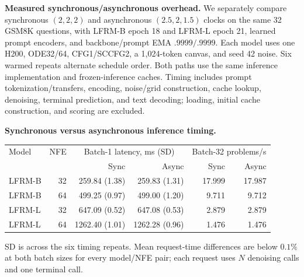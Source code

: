 \documentclass{article}
\newenvironment{revision}{\begingroup\color{blue}}{\endgroup}
\newcommand{\reviewcolor}{\color{blue}}
\begin{document}
\begin{revision}
\noindent\begin{minipage}{\linewidth}\reviewcolor
\textbf{Measured synchronous/asynchronous overhead.} We separately compare synchronous $(2,2,2)$ and asynchronous $(2.5,2,1.5)$ clocks on the same 32 GSM8K questions, with LFRM-B epoch 18 and LFRM-L epoch 21, learned prompt encoders, and backbone/prompt EMA $.9999/.9999$. Each model uses one H200, ODE32/64, CFG1/SCCFG2, a 1,024-token canvas, and seed 42 noise. Six warmed repeats alternate schedule order. Both paths use the same inference implementation and frozen-inference caches. Timing includes prompt tokenization/transfers, encoding, noise/grid construction, cache lookup, denoising, terminal prediction, and text decoding; loading, initial cache construction, and scoring are excluded.
\begin{center}\small
\setlength{\tabcolsep}{4pt}
\textbf{Synchronous versus asynchronous inference timing.}\par\smallskip
\begin{tabular}{@{}lrrrrr@{}}\toprule
Model & NFE & \multicolumn{2}{c}{Batch-1 latency, ms (SD)} & \multicolumn{2}{c}{Batch-32 problems/s}\\
& & Sync & Async & Sync & Async\\\midrule
LFRM-B & 32 & 259.84 (1.38) & 259.83 (1.31) & 17.999 & 17.987\\
LFRM-B & 64 & 499.25 (0.97) & 499.00 (1.20) & 9.711 & 9.712\\
LFRM-L & 32 & 647.09 (0.52) & 647.08 (0.53) & 2.879 & 2.879\\
LFRM-L & 64 & 1262.40 (1.01) & 1262.28 (0.96) & 1.476 & 1.476\\
\bottomrule\end{tabular}
\end{center}
SD is across the six timing repeats. Mean request-time differences are below $0.1\%$ at both batch sizes for every model/NFE pair; each request uses $N$ denoising calls and one terminal call.
\end{minipage}


\end{revision}
\end{document}
